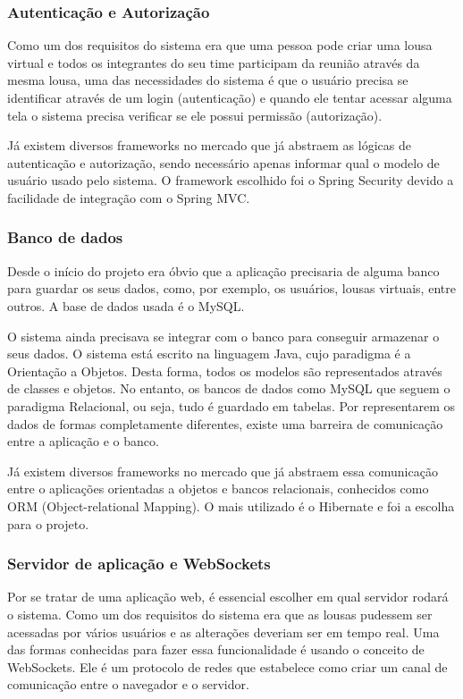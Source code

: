 \subsubsection*{Autenticação e Autorização}

Como um dos requisitos do sistema era que uma pessoa pode criar uma lousa virtual e todos os integrantes do seu time participam da reunião através da mesma lousa, uma das necessidades do sistema é que o usuário precisa se identificar através de um login (autenticação) e quando ele tentar acessar alguma tela o sistema precisa verificar se ele possui permissão (autorização).

Já existem diversos frameworks no mercado que já abstraem as lógicas de autenticação e autorização, sendo necessário apenas informar qual o modelo de usuário usado pelo sistema. O framework escolhido foi o Spring Security devido a facilidade de integração com o Spring MVC.

\subsubsection*{Banco de dados}

Desde o início do projeto era óbvio que a aplicação precisaria de alguma banco para guardar os seus dados, como, por exemplo, os usuários, lousas virtuais, entre outros. A base de dados usada é o MySQL.

O sistema ainda precisava se integrar com o banco para conseguir armazenar o seus dados. O sistema está escrito na linguagem Java, cujo paradigma é a Orientação a Objetos. Desta forma, todos os modelos são representados através de classes e objetos. No entanto, os bancos de dados como MySQL que seguem o paradigma Relacional, ou seja, tudo é guardado em tabelas. Por representarem os dados de formas completamente diferentes, existe uma barreira de comunicação entre a aplicação e o banco.

Já existem diversos frameworks no mercado que já abstraem essa comunicação entre o aplicações orientadas a objetos e bancos relacionais, conhecidos como ORM (Object-relational Mapping). O mais utilizado é o Hibernate e foi a escolha para o projeto.

\subsubsection*{Servidor de aplicação e WebSockets}

Por se tratar de uma aplicação web, é essencial escolher em qual servidor rodará o sistema. Como um dos requisitos do sistema era que as lousas pudessem ser acessadas por vários usuários e as alterações deveriam ser em tempo real. Uma das formas conhecidas para fazer essa funcionalidade é usando o conceito de WebSockets. Ele é um protocolo de redes que estabelece como criar um canal de comunicação entre o navegador e o servidor.

